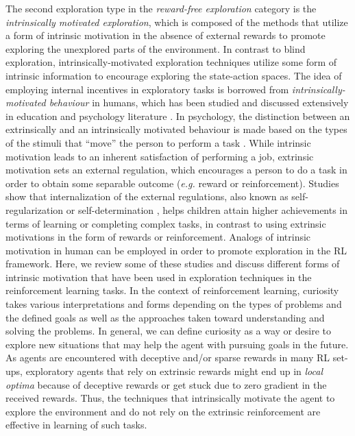 \label{sec:intrinsic}
The second exploration type in the \emph{reward-free exploration} category is the \emph{intrinsically motivated exploration}, which is composed of the methods that utilize a form of intrinsic motivation in the absence of external rewards to promote exploring the unexplored parts of the environment. In contrast to blind exploration, intrinsically-motivated exploration techniques utilize some form of intrinsic information to encourage exploring the state-action spaces. The idea of employing internal incentives in exploratory tasks is borrowed from \emph{intrinsically-motivated behaviour} in humans, which has been studied and discussed extensively in education and psychology literature . In psychology, the distinction between an extrinsically and an intrinsically motivated behaviour is made based on the types of the stimuli that ``move'' the person to perform a task . While intrinsic motivation leads to an inherent satisfaction of performing a job, extrinsic motivation sets an external regulation, which encourages a person to do a task in order to obtain some separable outcome (\emph{e.g.} reward or reinforcement). Studies show that internalization of the external regulations, also known as self-regularization or self-determination , helps children attain higher achievements  in terms of learning or completing complex tasks, in contrast to using extrinsic motivations in the form of rewards or reinforcement. Analogs of intrinsic motivation in human can be employed in order to promote exploration in the RL framework. Here, we review some of these studies and discuss different forms of intrinsic motivation that have been used in exploration techniques in the reinforcement learning tasks. 
In the context of reinforcement learning, curiosity takes various interpretations and forms depending on the types of problems and the defined goals as well as the approaches taken toward understanding and solving the problems. In general, we can define curiosity as a way or desire to explore new situations that may help the agent with pursuing goals in the future. As agents are encountered with deceptive and/or sparse rewards in many RL set-ups, exploratory agents that rely on extrinsic rewards might end up in \emph{local optima} because of deceptive rewards or get stuck due to zero gradient in the received rewards. Thus, the techniques that intrinsically motivate the agent to explore the environment and do not rely on the extrinsic reinforcement are effective in learning of such tasks.

